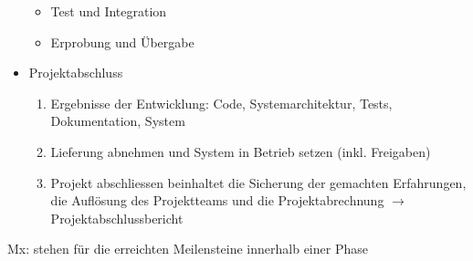 \begin{itemize}
\begin{itemize}
        \item Test und Integration
        \item Erprobung und Übergabe
    \end{itemize}
    \item Projektabschluss
    \begin{enumerate}
        \item Ergebnisse der Entwicklung: Code, Systemarchitektur, Tests, Dokumentation, System
        \item Lieferung abnehmen und System in Betrieb setzen (inkl. Freigaben)
        \item Projekt abschliessen beinhaltet die Sicherung der gemachten Erfahrungen, die Auflösung des Projektteams und die Projektabrechnung \(\rightarrow\) Projektabschlussbericht
    \end{enumerate}
\end{itemize}
Mx: stehen für die erreichten Meilensteine innerhalb einer Phase

% 
